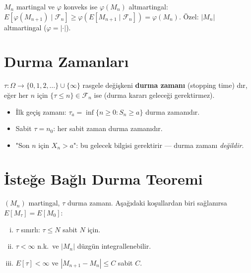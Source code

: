 \begin{onerme}
$M_n$ martingal ve $\varphi$ konveks ise $\varphi(M_n)$ altmartingal:
$E[\varphi(M_{n+1})\mid\mathcal{F}_n] \geq \varphi(E[M_{n+1}\mid\mathcal{F}_n]) = \varphi(M_n)$.
Özel: $|M_n|$ altmartingal ($\varphi = |\cdot|$).
\end{onerme}

\section{Durma Zamanları}
\label{sec:durma_zamani}

\begin{tanim}
\label{def:durma_zamani}
$\tau : \Omega \to \{0,1,2,\ldots\} \cup \{\infty\}$ rasgele değişkeni
\textbf{durma zamanı} (stopping time) dır, eğer her $n$ için
$\{\tau \leq n\} \in \mathcal{F}_n$ ise (durma kararı geleceği gerektirmez).
\end{tanim}

\begin{ornek}
\begin{itemize}
  \item İlk geçiş zamanı: $\tau_a = \inf\{n \geq 0 : S_n \geq a\}$ durma zamanıdır.
  \item Sabit $\tau = n_0$: her sabit zaman durma zamanıdır.
  \item "Son $n$ için $X_n > a$": bu gelecek bilgisi gerektirir --- durma zamanı \emph{değildir}.
\end{itemize}
\end{ornek}

\section{İsteğe Bağlı Durma Teoremi}
\label{sec:ibd_teoremi}

\begin{teorem}
\label{thm:ibd}
$(M_n)$ martingal, $\tau$ durma zamanı. Aşağıdaki koşullardan biri sağlanırsa
$E[M_\tau] = E[M_0]$:
\begin{enumerate}[(i)]
  \item $\tau$ sınırlı: $\tau \leq N$ sabit $N$ için.
  \item $\tau < \infty$ n.k.\ ve $|M_n|$ düzgün integrallenebilir.
  \item $E[\tau] < \infty$ ve $|M_{n+1}-M_n| \leq C$ sabit $C$.
\end{enumerate}
\end{teorem}

